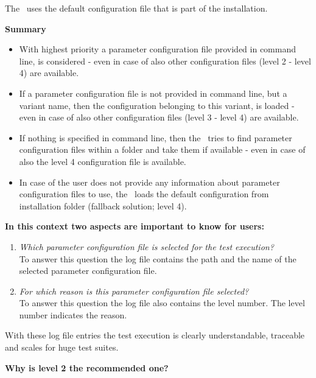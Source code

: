 The \pkg\ uses the default configuration file that is part of the installation.

\vspace{2ex}

\textbf{Summary}

\begin{itemize}
   \item With highest priority a parameter configuration file provided in command line, is considered - even in case of also other
configuration files (level 2 - level 4) are available.
   \item If a parameter configuration file is not provided in command line, but a variant name, then the configuration belonging
to this variant, is loaded - even in case of also other configuration files (level 3 - level 4) are available.
   \item If nothing is specified in command line, then the \pkg\ tries to find parameter configuration files within a  folder
and take them if available - even in case of also the level 4 configuration file is available.
   \item In case of the user does not provide any information about parameter configuration files to use, the \pkg\ loads the
default configuration from installation folder (fallback solution; level 4).
\end{itemize}

\textbf{In this context two aspects are important to know for users:}

\begin{enumerate}
   \item \textit{Which parameter configuration file is selected for the test execution?}\\
To answer this question the log file contains the path and the name of the selected parameter configuration file.
   \item \textit{For which reason is this parameter configuration file selected?}\\
To answer this question the log file also contains the level number. The level number indicates the reason.
\end{enumerate}

With these log file entries the test execution is clearly understandable, traceable and scales for huge test suites.

\vspace{2ex}

\textbf{Why is level 2 the recommended one?}

